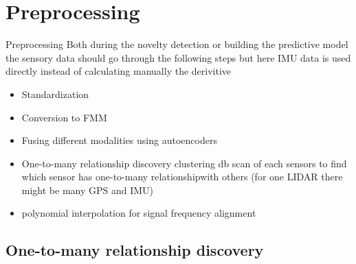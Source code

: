 \section{Preprocessing}
    \begin{frame}[allowframebreaks]{Preprocessing}
        Both during the novelty detection or building the predictive model the sensory data should go through the following steps but here IMU data is used directly instead of calculating manually the derivitive
        \begin{itemize}
            \item Standardization
            \item Conversion to FMM
            \item Fusing different modalities using autoencoders
            \item One-to-many relationship discovery clustering db scan of each sensors to find which sensor has one-to-many relationshipwith others (for one LIDAR there might be many GPS and IMU)
            \item polynomial interpolation for signal frequency alignment
        \end{itemize}

    \end{frame}

    \subsection{One-to-many relationship discovery}
        
        
